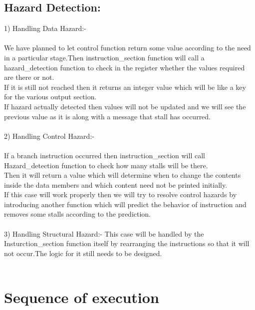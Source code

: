 \documentclass{scrreprt}
\begin{document}
\section{Hazard Detection:}
$ $
\\
1) Handling Data Hazard:- \\
\\We have planned to let control function return some value according to the need in a particular stage.Then instruction_section function will call a hazard_detection function to check in the register whether the values required are there or not.\\
If it is still not reached then it returns an integer value which will be like a key for the various output section. \\
If hazard actually detected then values will not be updated and we will see the previous value as it is along with a message that stall has occurred.\\
\\
2) Handling Control Hazard:- \\
\\If a branch instruction occurred then instruction_section will call Hazard_detection function to check how many stalls will be there.\\
Then it will return a value which will determine when to change the contents inside the data members and which content need not be printed initially.
\\If this case will work properly then we will try to resolve control hazards by introducing another function which will predict the behavior of instruction and removes some stalls according to the prediction.\\
\\3) Handling Structural Hazard:- This case will be handled by the Insturction_section function itself by rearranging the instructions so that it will not occur.The logic for it still needs to be designed.\\
\\
\chapter{Sequence of execution}
$ $
\\
\\
$ $
\end{document}
